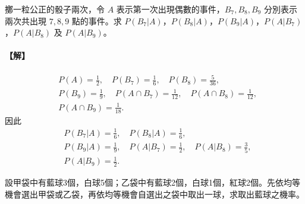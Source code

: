 \medskip
\begin{example}\label{ex:b5s-4-7}
擲一粒公正的骰子兩次，令 $A$ 表示第一次出現偶數的事件，$B_7, B_8, B_9$ 分別表示兩次共出現 $7, 8, 9$ 點的事件。求 $P(B_7|A)$，$P(B_8|A)$，$P(B_9|A)$，$P(A|B_7)$，$P(A|B_8)$ 及 $P(A|B_9)$。
\end{example}
\paragraph{【解】}
\begin{align*}
&P(A) = \frac{1}{2}, \quad P(B_7) = \frac{1}{6}, \quad P(B_8) = \frac{5}{36}, \\
&P(B_9) = \frac{1}{9}, \quad P(A \cap B_7) = \frac{1}{12}, \quad P(A \cap B_8) = \frac{1}{12}, \\
&P(A \cap B_9) = \frac{1}{18}.
\end{align*}
因此
\begin{align*}
&P(B_7|A) = \frac{1}{6}, \quad P(B_8|A) = \frac{1}{6}, \\
&P(B_9|A) = \frac{1}{9}, \quad P(A|B_7) = \frac{1}{2}, \quad P(A|B_8) = \frac{3}{5}, \\
&P(A|B_9) = \frac{1}{2}. \tag*{\#}
\end{align*}

\medskip
\begin{discussion}\label{disc:b5s-4-5}
設甲袋中有藍球3個，白球5個；乙袋中有藍球2個，白球1個，紅球2個。先依均等機會選出甲袋或乙袋，再依均等機會自選出之袋中取出一球，求取出藍球之機率。
\end{discussion}
